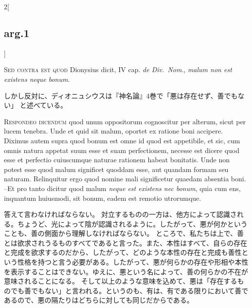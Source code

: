 \documentclass[paper=a4paper,fontsize=10pt,jafontsize=9pt,titlepage]{jlreq}
\begin{document}
\begin{paracol}{2}[\subsection{arg.1}]
\switchcolumn*[\subsection{s.c.}]

{\scshape Sed contra est quod} Dionysius dicit, IV cap. {\itshape de
Div.~Nom}., {\itshape malum non est existens neque bonum}.

\switchcolumn

しかし反対に、ディオニュシウスは『神名論』4巻で「悪は存在せず、善でもない」
と述べている。


{\scshape Respondeo dicendum} quod unum oppositorum cognoscitur per
alterum, sicut per lucem tenebra. Unde et quid sit malum, oportet ex
ratione boni accipere. Diximus autem supra quod bonum est omne id quod
est appetibile, et sic, cum omnis natura appetat suum esse et suam
perfectionem, necesse est dicere quod esse et perfectio cuiuscumque
naturae rationem habeat bonitatis. Unde non potest esse quod malum
significet quoddam esse, aut quandam formam seu naturam. Relinquitur
ergo quod nomine mali significetur quaedam absentia boni. --Et pro tanto
dicitur quod malum {\itshape neque est existens nec bonum}, quia cum
ens, inquantum huiusmodi, sit bonum, eadem est remotio utrorumque.

\switchcolumn

答えて言わなければならない。
対立するものの一方は、他方によって認識される。ちょうど、光によって陰が認識されるように。したがって、悪が何かということも、善の側面から理解しなければならない。
ところで、私たちは上で、善とは欲求されうるものすべてであると言った。また、本性はすべて、自らの存在と完成を欲求するのだから、したがって、どのような本性の存在と完成も善性という性格を持つと言う必要がある。したがって、悪が何らかの存在や形相や本性を表示することはできない。ゆえに、悪という名によって、善の何らかの不在が意味されることになる。
そして以上のような意味を込めて、悪は「存在するものでも善でもない」と言われる。というのも、有は、有である限りにおいて善であるので、悪の隔たりはどちらに対しても同じだからである。

\switchcolumn*[\subsection{ad.1}]


\end{paracol}
\end{document}
